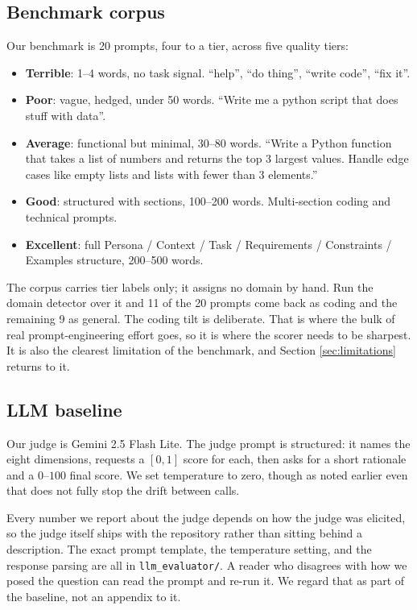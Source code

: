 \documentclass[conference]{IEEEtran}
\begin{document}
\subsection{Benchmark corpus}
Our benchmark is 20 prompts, four to a tier, across five quality tiers:
\begin{itemize}
\item \textbf{Terrible}: 1--4 words, no task signal. ``help'', ``do thing'', ``write code'', ``fix it''.
\item \textbf{Poor}: vague, hedged, under 50 words. ``Write me a python script that does stuff with data''.
\item \textbf{Average}: functional but minimal, 30--80 words. ``Write a Python function that takes a list of numbers and returns the top 3 largest values. Handle edge cases like empty lists and lists with fewer than 3 elements.''
\item \textbf{Good}: structured with sections, 100--200 words. Multi-section coding and technical prompts.
\item \textbf{Excellent}: full Persona / Context / Task / Requirements / Constraints / Examples structure, 200--500 words.
\end{itemize}

The corpus carries tier labels only; it assigns no domain by hand. Run the domain detector over it and 11 of the 20 prompts come back as coding and the remaining 9 as general. The coding tilt is deliberate. That is where the bulk of real prompt-engineering effort goes, so it is where the scorer needs to be sharpest. It is also the clearest limitation of the benchmark, and Section \ref{sec:limitations} returns to it.

\subsection{LLM baseline}
Our judge is Gemini 2.5 Flash Lite. The judge prompt is structured: it names the eight dimensions, requests a $[0, 1]$ score for each, then asks for a short rationale and a $0$--$100$ final score. We set temperature to zero, though as noted earlier even that does not fully stop the drift between calls.

Every number we report about the judge depends on how the judge was elicited, so the judge itself ships with the repository rather than sitting behind a description. The exact prompt template, the temperature setting, and the response parsing are all in \texttt{llm\_evaluator/}. A reader who disagrees with how we posed the question can read the prompt and re-run it. We regard that as part of the baseline, not an appendix to it.
\end{document}

